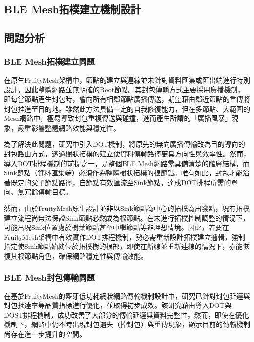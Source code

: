 \begin{ZhChapter}

\chapter{BLE Mesh拓樸建立機制設計}

\section{問題分析}

\subsection{BLE Mesh拓樸建立問題}

在原生FruityMesh架構中，節點的建立與連線並未針對資料匯集或匯出端進行特別設計，因此整體網路並無明確的Root節點。其封包傳輸方式主要採用廣播機制，即每當節點產生封包時，會向所有相鄰節點廣播傳送，期望藉由鄰近節點的重傳將封包推進至目的地。雖然此方法具備一定的自我修復能力，但在多節點、大範圍的Mesh網路中，極易導致封包重複傳送與碰撞，進而產生所謂的「廣播風暴」現象，嚴重影響整體網路效能與穩定性。

為了解決此問題，\cite{112TIT00392032}研究中引入DOT機制，將原先的無向廣播傳輸改為目的導向的封包路由方式，透過樹狀拓樸的建立使資料傳輸路徑更具方向性與效率性。然而，導入DOT排程機制的前提之一，是整個BLE Mesh網路需具備清楚的階層結構，而Sink節點（資料匯集端）必須作為整體樹狀拓樸的根節點。唯有如此，封包才能沿著既定的父子節點路徑，自節點有效匯流至Sink節點，達成DOT排程所需的單向、無冗餘傳輸目標。

然而，由於FruityMesh原生設計並非以Sink節點為中心的拓樸為出發點，現有拓樸建立流程尚無法保證Sink節點必然成為根節點。在未進行拓樸控制調整的情況下，可能出現Sink位置處於樹葉節點甚至中繼節點等非理想情境。因此，若要在FruityMesh架構中有效實作DOT排程機制，勢必需重新設計拓樸建立邏輯，強制指定使Sink節點始終位於拓樸樹的根部，即使在斷線並重新連線的情況下，亦能恢復其根節點角色，確保網路穩定性與傳輸效能。

\subsection{BLE Mesh封包傳輸問題}

在基於FruityMesh的藍牙低功耗網狀網路傳輸機制設計中，\cite{112TIT00392032}研究已針對封包延遲與封包抵達率等品質指標進行優化，並取得初步成效。該研究藉由導入DOT與DOST排程機制，成功改善了大部分的傳輸延遲與資料完整性。然而，即使在優化機制下，網路中仍不時出現封包遺失（掉封包）與重傳現象，顯示目前的傳輸機制尚存在進一步提升的空間。


\end{ZhChapter}
